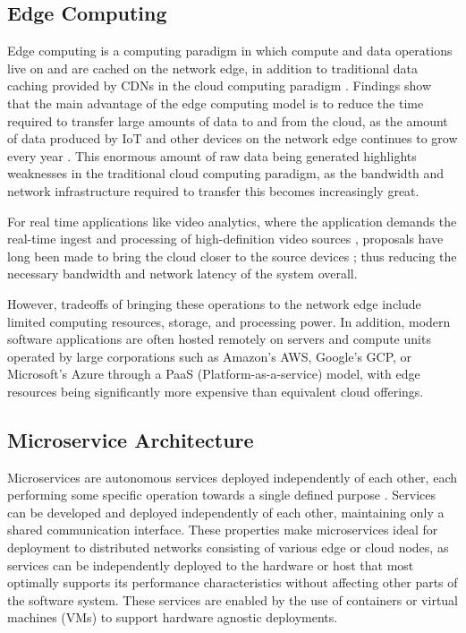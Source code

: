 \documentclass[11pt]{article}
\begin{document}
\subsection{Edge Computing}
Edge computing is a computing paradigm in which compute and data operations live on and are cached
on the network edge, in addition to traditional data caching provided by CDNs in the cloud computing
paradigm \cite{kubiak_possible_2022}. Findings show that the main advantage of the edge computing model is 
to reduce the time required to transfer large amounts of data to and from the cloud, as the 
amount of data produced by IoT and other devices on the network edge continues to grow every year
\cite{7488250}.
This enormous amount of raw data being generated highlights weaknesses in the traditional cloud
computing paradigm, as the bandwidth and network infrastructure required to transfer this becomes 
increasingly great.\newline

For real time applications like video analytics, 
where the application demands the real-time ingest and processing of high-definition video sources \cite{NAYAK2024783},
proposals have long been made to bring the cloud closer to the source devices \cite{satyanarayanan_case_2009}; thus reducing the
necessary bandwidth and network latency of the system overall.\newline

However, tradeoffs of bringing these operations to the network edge include limited computing 
resources, storage, and processing power. In addition, modern software applications are often
hosted remotely on servers and compute units operated by large corporations such as Amazon's AWS, 
Google's GCP, or Microsoft's Azure through a PaaS (Platform-as-a-service) model, with edge
resources being significantly more expensive than equivalent cloud offerings.

\subsection{Microservice Architecture}
Microservices are autonomous services deployed independently of each other, each performing some
specific operation towards a single defined purpose \cite{auer_monolithic_2021}. Services can be developed and deployed
independently of each other, maintaining only a shared communication interface. These properties
make microservices ideal for deployment to distributed networks consisting of various edge
or cloud nodes, as services can be independently deployed to the hardware or host that most 
optimally supports its performance characteristics without affecting other parts of the 
software system. These services are enabled by the use of containers or virtual machines (VMs)
to support hardware agnostic deployments. \newline
\end{document}
